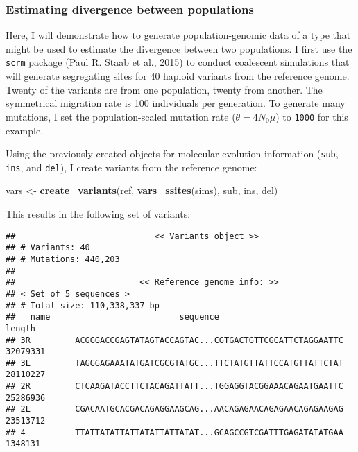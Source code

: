 \documentclass[12pt,]{article}
\newenvironment{Shaded}{\begin{snugshade}}{\end{snugshade}}
\newcommand{\KeywordTok}[1]{\textcolor[rgb]{0.13,0.29,0.53}{\textbf{#1}}}
\newcommand{\NormalTok}[1]{#1}
\newcommand{\OperatorTok}[1]{\textcolor[rgb]{0.81,0.36,0.00}{\textbf{#1}}}
\newcommand{\StringTok}[1]{\textcolor[rgb]{0.31,0.60,0.02}{#1}}
\begin{document}
\hypertarget{estimating-divergence-between-populations}{%
\subsubsection{Estimating divergence between populations}\label{estimating-divergence-between-populations}}

Here, I will demonstrate how to generate population-genomic data of a type that might
be used to estimate the divergence between two populations.
I first use the \texttt{scrm} package (Paul R. Staab et al., 2015) to conduct
coalescent simulations that will generate segregating sites for 40 haploid variants
from the reference genome.
Twenty of the variants are from one population, twenty from another.
The symmetrical migration rate is 100 individuals per generation.
To generate many mutations, I set the population-scaled mutation rate
(\(\theta = 4 N_0 \mu\)) to \texttt{1000} for this example.

\begin{Shaded}
\end{Shaded}

Using the previously created objects for molecular evolution information (\texttt{sub},
\texttt{ins}, and \texttt{del}), I create variants from the reference genome:

\begin{Shaded}
\begin{Highlighting}[]
\NormalTok{vars <-}\StringTok{ }\KeywordTok{create_variants}\NormalTok{(ref,}
                        \KeywordTok{vars_ssites}\NormalTok{(sims),}
\NormalTok{                        sub, ins, del)}
\end{Highlighting}
\end{Shaded}

This results in the following set of variants:

\begin{verbatim}
##                            << Variants object >>
## # Variants: 40
## # Mutations: 440,203
## 
##                         << Reference genome info: >>
## < Set of 5 sequences >
## # Total size: 110,338,337 bp
##   name                          sequence                             length
## 3R         ACGGGACCGAGTATAGTACCAGTAC...CGTGACTGTTCGCATTCTAGGAATTC  32079331
## 3L         TAGGGAGAAATATGATCGCGTATGC...TTCTATGTTATTCCATGTTATTCTAT  28110227
## 2R         CTCAAGATACCTTCTACAGATTATT...TGGAGGTACGGAAACAGAATGAATTC  25286936
## 2L         CGACAATGCACGACAGAGGAAGCAG...AACAGAGAACAGAGAACAGAGAAGAG  23513712
## 4          TTATTATATTATTATATTATTATAT...GCAGCCGTCGATTTGAGATATATGAA   1348131
\end{verbatim}
\end{document}
